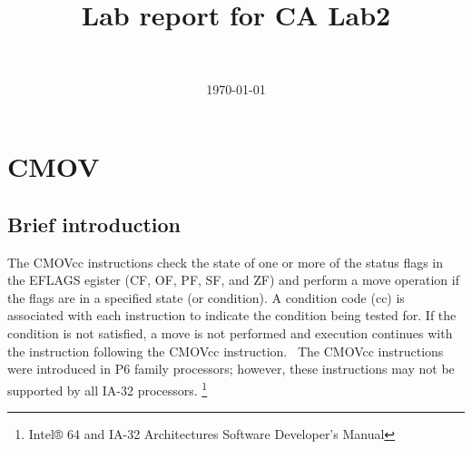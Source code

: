\documentclass[10pt, a4paper, twocolumn]{article} %
\title{Lab report for CA Lab2} %
\author{
        \authorstyle{Xiangzhe Xu} %
        \newline\newline %
        \institution{Nanjing University}\\ %
    }
\date{\today} %
\begin{document}
    
    \maketitle %
    
    \thispagestyle{firstpage} %
    
    
    
    
    \section{CMOV}
    \subsection{Brief introduction}
    The CMOVcc instructions check the state of one or more of the status flags in the EFLAGS 
    egister (CF, OF, PF, SF, and ZF) and perform a move operation if the flags are 
    in a specified state (or condition). A condition code (cc) is associated with each 
    instruction to indicate the condition being tested for. 
    If the condition is not satisfied, a move is not performed and execution continues 
    with the instruction following the CMOVcc instruction.
    \
    The CMOVcc instructions were introduced in P6 family processors; however,
     these instructions may not be supported by all IA-32 processors.
    \footnote{Intel® 64 and IA-32 Architectures Software Developer’s Manual}

\end{document}
